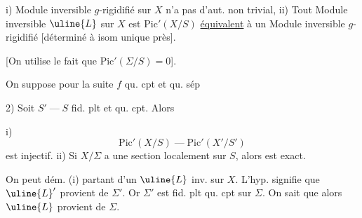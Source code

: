 i)  Module inversible $g$-rigidifié sur $X$ n'a pas d'aut. non trivial, ii) Tout Module inversible $\uline{L}$ sur $X$ est  $\mathrm{Pic}'(X/S)$ \uline{équivalent} à  un Module inversible $g$-rigidifié  [déterminé à isom unique près].

[On utilise le fait que $\mathrm{Pic}'(\Sigma/S)=0$].

On suppose pour la suite $f$ qu. cpt et qu. sép

\margin{$\unsure{\simeq}$}




2) Soit $S'\mathbin{\text{---}}S$ fid. plt et qu. cpt. Alors

i)
\[
\mathrm{Pic}'(X/S)\mathbin{\text{---}}\mathrm{Pic}'(X'/S')
\]
est injectif. ii) Si $X/\Sigma$ a  une section  localement sur $S$, alors
est exact.

On peut dém. (i) partant d'un $\uline{L}$ inv. sur $X$.  L'hyp. signifie que $\uline{L}'$ provient de $\Sigma'$. Or $\Sigma'$ est fid. plt qu. cpt sur $\Sigma$. On sait que alors $\uline{L}$ provient de $\Sigma$.

